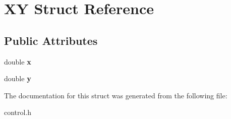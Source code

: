 \hypertarget{structXY}{}\section{XY Struct Reference}
\label{structXY}
\subsection*{Public Attributes}
\begin{DoxyCompactItemize}
\item 
\mbox{\label{structXY_a4d12443240fd1aebc164deac323e5b96}} 
double {\bfseries x}
\item 
\mbox{\label{structXY_a89d0178ba6dabee476d0576496c9b197}} 
double {\bfseries y}
\end{DoxyCompactItemize}


The documentation for this struct was generated from the following file\+:\begin{DoxyCompactItemize}
\item 
control.\+h\end{DoxyCompactItemize}
